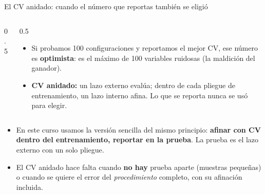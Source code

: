 \documentclass{beamer}
\newcommand{\1}{\mathbb{I}}
\begin{document}
\begin{frame}{El CV anidado: cuando el número que reportas también se eligió}
\small
\begin{columns}[T]
\begin{column}{0.5\textwidth}
\begin{center}
\end{center}
\end{column}
\begin{column}{0.5\textwidth}
\vspace{0.05cm}
\begin{itemize}\itemsep3pt
  \item Si probamos 100 configuraciones y reportamos el mejor CV, ese número es \textbf{optimista}: es el máximo de 100 variables ruidosas (la maldición del ganador).
  \item \textbf{CV anidado:} un lazo externo evalúa; dentro de cada pliegue de entrenamiento, un lazo interno afina. Lo que se reporta nunca se usó para elegir.
\end{itemize}
\end{column}
\end{columns}
\pause
\begin{itemize}\itemsep3pt
  \item En este curso usamos la versión sencilla del mismo principio: \textbf{afinar con CV dentro del entrenamiento, reportar en la prueba}. La prueba es el lazo externo con un solo pliegue.
  \item El CV anidado hace falta cuando \textbf{no hay} prueba aparte (muestras pequeñas) o cuando se quiere el error del \emph{procedimiento} completo, con su afinación incluida.
\end{itemize}
\end{frame}
\end{document}
